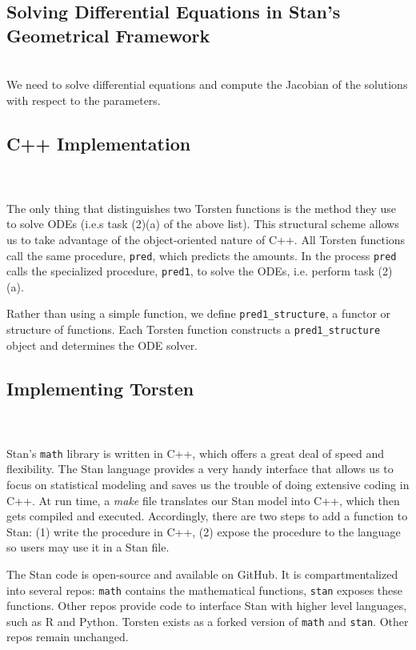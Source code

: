\documentclass[11pt]{amsart}
\begin{document}
\subsection{Solving Differential Equations in Stan's Geometrical Framework} \ \\

We need to solve differential equations and compute the Jacobian of the solutions with respect to the parameters. 

\subsection{C++ Implementation} \ \\ \ \\
The only thing that distinguishes two Torsten functions is the method they use to solve ODEs (i.e.s task (2)(a) of the above list). This structural scheme allows us to take advantage of the object-oriented nature of C++. All Torsten functions call the same procedure, \texttt{pred}, which predicts the amounts. In the process \texttt{pred} calls the specialized procedure, \texttt{pred1}, to solve the ODEs, i.e. perform task (2)(a).

Rather than using a simple function, we define \texttt{pred1\_structure}, a functor or structure of functions. Each Torsten function constructs a \texttt{pred1\_structure} object and determines the ODE solver.

\fi

\subsection{Implementing Torsten} \ \\ \ \\
Stan's \texttt{math} library is written in C++, which offers a great deal of speed and flexibility. The Stan language provides a very handy interface that allows us to focus on statistical modeling and saves us the trouble of doing extensive coding in C++. At run time, a \textit{make} file translates our Stan model into C++, which then gets compiled and executed. Accordingly, there are two steps to add a function to Stan: (1) write the procedure in C++, (2) expose the procedure to the language so users may use it in a Stan file.

The Stan code is open-source and available on GitHub. It is compartmentalized into several repos: \texttt{math} contains the mathematical functions, \texttt{stan} exposes these functions. Other repos provide code to interface Stan with higher level languages, such as R and Python. Torsten exists as a forked version of \texttt{math} and \texttt{stan}. Other repos remain unchanged.
\end{document}
